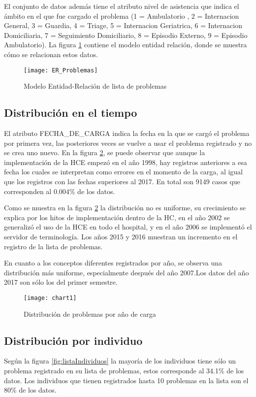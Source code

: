 El conjunto de datos además tiene el atributo nivel de asistencia que indica el ámbito en el que fue cargado el problema (1 = Ambulatorio , 2 = Internacion General, 3 = Guardia, 4 = Triage, 5 = Internacion Geriatrica, 6 = Internacion Domiciliaria, 7 = Seguimiento Domiciliario, 8 = Episodio Externo, 9 = Episodio Ambulatorio). La figura \ref{fig:ModeloER} contiene el modelo entidad relación, donde se muestra cómo se relacionan estos datos.

\begin{figure}[ht]
\caption{Modelo Entidad-Relación de lista de problemas}
\label{fig:ModeloER}
\centering
\texttt{[image: ER\_Problemas]}
\end{figure}

\subsection{Distribución en el tiempo}
El atributo FECHA\_DE\_CARGA indica la fecha en la que se cargó el problema por primera vez, las posteriores veces se vuelve a usar el problema registrado y no se crea uno nuevo. En la figura \ref{fig:registrosYConceptos}, se puede observar que aunque la implementación de la HCE empezó en el año 1998, hay registros anteriores a esa fecha los cuales se interpretan como errores en el momento de la carga, al igual que los registros con las fechas superiores al 2017. En total son \num{9149} casos que corresponden al \num{0,004}\% de los datos.

Como se muestra en la figura \ref{fig:registrosYConceptos} la distribución no es uniforme, su crecimiento se explica por los hitos de implementación dentro de la HC, en el año \num{2002} se generalizó el uso de la HCE en todo el hospital, y en el año \num{2006} se implementó el servidor de terminología. Los años \num{2015} y \num{2016} muestran un incremento en el registro de la lista de problemas.

En cuanto a los conceptos diferentes registrados por año, se observa una distribución más uniforme, especialmente después del año \num{2007}.Los datos del año 2017 son sólo los del primer semestre.

\begin{figure}[ht]
\caption{Distribución de problemas por año de carga}
\label{fig:registrosYConceptos}
\centering
\texttt{[image: chart1]}
\end{figure}

\subsection{Distribución por individuo}
Según la figura \ref{fig:listaIndividuos} la mayoría de los individuos tiene sólo un problema registrado en su lista de problemas, estos corresponde al \num{34.1}\% de los datos. Los individuos que tienen registrados hasta 10 problemas en la lista son el \num{80}\% de los datos.

